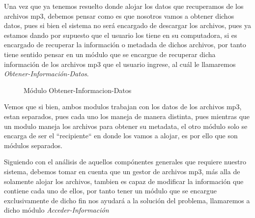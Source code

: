 \documentclass[10pt,letterpaper]{report}
\begin{document}
\vspace{0.5cm}

\noindent Una vez que ya tenemos resuelto donde alojar los datos que recuperamos de los archivos mp3, debemos pensar como es que nosotros vamos a obtener dichos datos, pues si bien el sistema no será encargado de descargar los archivos, pues ya estamos dando por supuesto que el usuario los tiene en su computadora, si es encargado de recuperar la información o metadada de dichos archivos, por tanto tiene sentido pensar en un módulo que se encargue de recuperar dicha información de los archivos mp3 que el usuario ingrese, al cuál le llamaremos \textit{Obtener-Información-Datos}.
\vspace{0.5cm}

\begin{figure}[H]
\centering


\caption{Módulo Obtener-Informacion-Datos}
\label{fig:obtener-informacion-datos}
\end{figure}

\vspace{0.3cm}

\noindent Vemos que si bien, ambos modulos trabajan con los datos de los archivos mp3, estan separados, pues cada uno los maneja de manera distinta, pues mientras que un modulo maneja los archivos para obtener su metadata, el otro módulo solo se encarga de ser el ``recipiente`` en donde los vamos a alojar, es por ello que son módulos separados.

\noindent

\vspace{0.5cm}

\noindent Siguiendo con el análisis de aquellos compónentes generales que requiere nuestro sistema, debemos tomar en cuenta que un gestor de archivos mp3, más alla de solamente alojar los archivos, tambien es capaz de modificar la información que contiene cada uno de ellos, por tanto tener un módulo que se encargue exclusivamente de dicho fin nos ayudará a la solución del problema, llamaremos a dicho módulo \textit{Acceder-Información}
\end{document}
